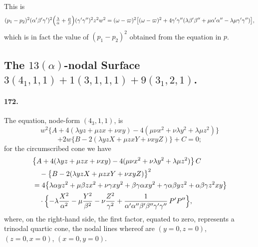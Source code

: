 \documentclass[11pt,a4paper]{article}
\begin{document}
This is
\[
(p_1 - p_2)^2 (\alpha'\beta'\gamma')^2\Bigl(\tfrac{\lambda}{\alpha} + \tfrac{\mu}{\beta}\Bigr)(\gamma'\gamma'')^2 z^2 w^2
= (\omega - \varpi)^2\bigl[(\omega - \varpi)^2 + 4\gamma'\gamma''(\lambda\beta'\beta'' + \mu\alpha'\alpha'' - \lambda\mu\gamma'\gamma'')\bigr],
\]
which is in fact the value of $(p_1 - p_2)^2$ obtained from the equation
in $p$.

\subsection*{The $13(\alpha)$-nodal Surface
$3(4_1, 1, 1) + 1(3, 1, 1, 1) + 9(3_1, 2, 1)$.}

\paragraph{172.}
The equation, node-form $(4_3, 1, 1)$, is
\[
w^2\bigl\{A + 4(\lambda yz + \mu zx + \nu xy)
- 4(\mu\nu x^2 + \nu\lambda y^2 + \lambda\mu z^2)\bigr\}
\]
\[
+ 2 w \bigl\{B - 2(\lambda yz X + \mu zx Y + \nu xy Z)\bigr\} + C = 0;
\]
for the circumscribed cone we have
\[
\begin{aligned}
& \bigl\{A + 4(\lambda yz + \mu zx + \nu xy) - 4(\mu\nu x^2 + \nu\lambda y^2 + \lambda\mu z^2)\bigr\}\, C \\
& \quad - \bigl\{B - 2(\lambda yz X + \mu zx Y + \nu xy Z)\bigr\}^2 \\
& = 4\bigl\{\lambda \alpha yz^2 + \mu \beta zx^2 + \nu \gamma xy^2
+ \beta\gamma\alpha xy^2 + \gamma\alpha\beta yz^2 + \alpha\beta\gamma z^2 xy\bigr\} \\
& \quad \cdot \Bigl\{- \lambda\frac{X^2}{\alpha^2} - \mu\frac{Y^2}{\beta^2}
- \nu\frac{Z^2}{\gamma^2} + \frac{1}{\alpha'\alpha''\beta'\beta''\gamma'\gamma''}\, P'P''\Bigr\},
\end{aligned}
\]
where, on the right-hand side, the first factor, equated to zero,
represents a trinodal quartic cone, the nodal lines whereof are
$(y = 0, z = 0)$, $(z = 0, x = 0)$, $(x = 0, y = 0)$.
\end{document}
